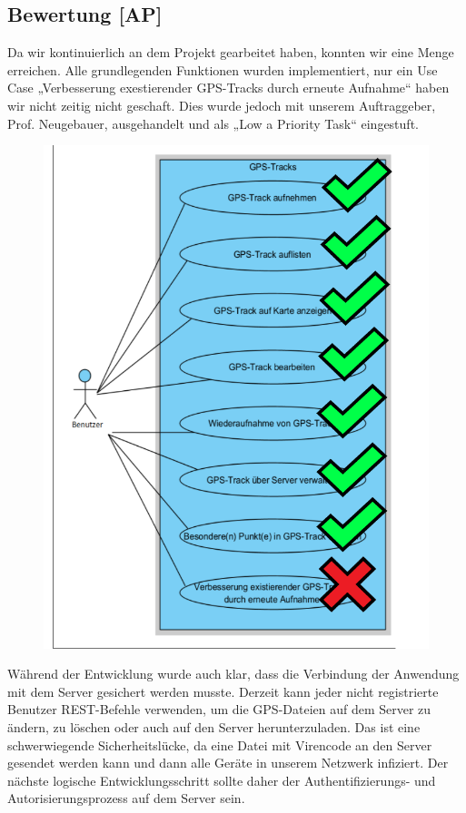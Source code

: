 \documentclass{article}
\begin{document}
\subsection{Bewertung [AP]}
    Da wir kontinuierlich an dem Projekt gearbeitet haben, konnten wir eine Menge erreichen. Alle grundlegenden Funktionen wurden implementiert,
    nur ein Use Case „Verbesserung  exestierender GPS-Tracks durch erneute Aufnahme“ haben wir nicht zeitig nicht geschaft. Dies wurde jedoch mit unserem 
    Auftraggeber, Prof. Neugebauer, ausgehandelt und als „Low a Priority Task“ eingestuft.
    \begin{figure}[H]
        \includegraphics[scale=0.27]{use_case_comleted.png}
    \end{figure}
    Während der Entwicklung wurde auch klar, dass die Verbindung der
    Anwendung mit dem Server gesichert werden musste. Derzeit kann jeder nicht registrierte Benutzer 
    REST-Befehle verwenden, um die GPS-Dateien auf dem Server zu ändern, zu löschen oder auch auf den Server
    herunterzuladen. Das ist eine schwerwiegende Sicherheitslücke, da eine Datei mit Virencode
    an den Server gesendet werden kann und dann alle Geräte in unserem Netzwerk infiziert. Der nächste logische Entwicklungsschritt
    sollte daher der Authentifizierungs- und Autorisierungsprozess auf dem Server sein.
\end{document}
